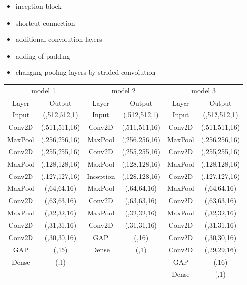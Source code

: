 \documentclass[
a4paper, 
12pt,
grayscalebody, %
abstract=on,
twoside, BCOR10mm, 12pt, DIV13,headinclude, footexclude, final, abstracton, openright
]{ibireprt}
\numberwithin{equation}{chapter}
\numberwithin{table}{chapter}
\numberwithin{figure}{chapter}
\numberwithin{algorithm}{chapter}
\numberwithin{example}{chapter}
\numberwithin{example}{chapter}
\begin{document}
\begin{itemize}
	\item inception block 
	\item shortcut connection
	\item additional convolution layers
	\item adding of padding 
	\item changing pooling layers by strided convolution 
	
\end{itemize} 
\begin{table}
\begin{tabular}{cccccc}
	\toprule
	\multicolumn{2}{c}{model 1} &\multicolumn{2}{c}{model 2} & \multicolumn{2}{c}{model 3} \\ 
	Layer & Output &Layer & Output &Layer & Output\\
	\cmidrule(l){1-2} \cmidrule(l){3-4}\cmidrule(l){5-6}
	Input&(,512,512,1)&Input&(,512,512,1)&Input&(,512,512,1)\\
	\cmidrule(l){1-2} \cmidrule(l){3-4}\cmidrule(l){5-6}
	Conv2D	& (,511,511,16) &Conv2D	& (,511,511,16)&Conv2D	& (,511,511,16)\\
	\cmidrule(l){1-2} \cmidrule(l){3-4}\cmidrule(l){5-6}
	MaxPool&(,256,256,16)&MaxPool&(,256,256,16)&MaxPool&(,256,256,16)\\
	\cmidrule(l){1-2} \cmidrule(l){3-4}\cmidrule(l){5-6}
	Conv2D&(,255,255,16)&Conv2D&(,255,255,16)&Conv2D&(,255,255,16)\\
	\cmidrule(l){1-2} \cmidrule(l){3-4}\cmidrule(l){5-6}
	MaxPool&(,128,128,16)&MaxPool&(,128,128,16)&MaxPool&(,128,128,16)\\
	\cmidrule(l){1-2} \cmidrule(l){3-4}\cmidrule(l){5-6}
	Conv2D&(,127,127,16)&Inception&(,128,128,16)&Conv2D&(,127,127,16)\\
	\cmidrule(l){1-2} \cmidrule(l){3-4}\cmidrule(l){5-6}
	MaxPool&(,64,64,16)&MaxPool&(,64,64,16)&MaxPool&(,64,64,16)\\
	\cmidrule(l){1-2} \cmidrule(l){3-4}\cmidrule(l){5-6}
	Conv2D&(,63,63,16)&Conv2D&(,63,63,16)&Conv2D&(,63,63,16)\\
	\cmidrule(l){1-2} \cmidrule(l){3-4}\cmidrule(l){5-6}
	MaxPool&(,32,32,16)&MaxPool&(,32,32,16)&MaxPool&(,32,32,16)\\
	\cmidrule(l){1-2} \cmidrule(l){3-4}\cmidrule(l){5-6}
	Conv2D&(,31,31,16)&Conv2D&(,31,31,16)&Conv2D&(,31,31,16)\\
	\cmidrule(l){1-2} \cmidrule(l){3-4}\cmidrule(l){5-6}
	Conv2D&(,30,30,16)&GAP&(,16)&Conv2D&(,30,30,16)\\
	\cmidrule(l){1-2} \cmidrule(l){3-4}\cmidrule(l){5-6}
	GAP&(,16)&Dense&(,1)&Conv2D&(,29,29,16)\\
	\cmidrule(l){1-2} \cmidrule(l){3-4}\cmidrule(l){5-6}
	Dense&(,1)&&&GAP&(,16)\\
	\cmidrule(l){5-6}
	& & & &Dense&(,1)\\
\end{tabular}


\end{table}
\end{document}
